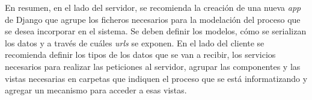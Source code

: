 En resumen, en el lado del servidor, se recomienda la creación de una nueva \textit{app} de Django que agrupe los ficheros necesarios para la modelación del 
proceso que se desea incorporar en el sistema. Se deben definir los modelos, cómo se serializan los datos y a través de cuáles \textit{urls} se exponen.
En el lado del cliente se recomienda definir los tipos de los datos que se van a recibir, los servicios necesarios para realizar 
las peticiones al servidor, agrupar las componentes y las vistas necesarias en carpetas que indiquen el proceso que se está informatizando y agregar un mecanismo para 
acceder a esas vistas. 


    




